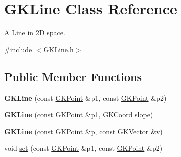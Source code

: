 \hypertarget{classGKLine}{}\section{G\+K\+Line Class Reference}
\label{classGKLine}


A Line in 2D space.  




{\ttfamily \#include $<$G\+K\+Line.\+h$>$}

\subsection*{Public Member Functions}
\begin{DoxyCompactItemize}
\item 
{\bfseries G\+K\+Line} (const \hyperlink{classGKPoint}{G\+K\+Point} \&p1, const \hyperlink{classGKPoint}{G\+K\+Point} \&p2)\hypertarget{classGKLine_a76ebfc0786fab10adcbdc0e25c9dbe8d}{}\label{classGKLine_a76ebfc0786fab10adcbdc0e25c9dbe8d}

\item 
{\bfseries G\+K\+Line} (const \hyperlink{classGKPoint}{G\+K\+Point} \&p1, G\+K\+Coord slope)\hypertarget{classGKLine_a26dafa86a78052fcc39c8cd28ee139ea}{}\label{classGKLine_a26dafa86a78052fcc39c8cd28ee139ea}

\item 
{\bfseries G\+K\+Line} (const \hyperlink{classGKPoint}{G\+K\+Point} \&p, const G\+K\+Vector \&v)\hypertarget{classGKLine_a53e6eee5cd7d90e8f3f4e9052bc99c27}{}\label{classGKLine_a53e6eee5cd7d90e8f3f4e9052bc99c27}

\item 
void \hyperlink{classGKLine_a6026d00869da073bcd45e8a1501ece88}{set} (const \hyperlink{classGKPoint}{G\+K\+Point} \&p1, const \hyperlink{classGKPoint}{G\+K\+Point} \&p2)\hypertarget{classGKLine_a6026d00869da073bcd45e8a1501ece88}{}\label{classGKLine_a6026d00869da073bcd45e8a1501ece88}


\end{DoxyCompactItemize}
